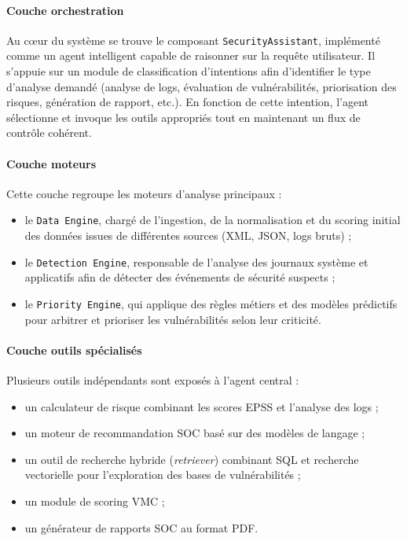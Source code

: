 \documentclass[runningheads]{llncs}
\begin{document}
\paragraph{Couche orchestration}
Au cœur du système se trouve le composant \texttt{SecurityAssistant}, implémenté comme un agent intelligent capable de raisonner sur la requête utilisateur. Il s’appuie sur un module de classification d’intentions afin d’identifier le type d’analyse demandé (analyse de logs, évaluation de vulnérabilités, priorisation des risques, génération de rapport, etc.). En fonction de cette intention, l’agent sélectionne et invoque les outils appropriés tout en maintenant un flux de contrôle cohérent.

\paragraph{Couche moteurs}
Cette couche regroupe les moteurs d’analyse principaux :
\begin{itemize}
    \item le \texttt{Data Engine}, chargé de l’ingestion, de la normalisation et du scoring initial des données issues de différentes sources (XML, JSON, logs bruts) ;
    \item le \texttt{Detection Engine}, responsable de l’analyse des journaux système et applicatifs afin de détecter des événements de sécurité suspects ;
    \item le \texttt{Priority Engine}, qui applique des règles métiers et des modèles prédictifs pour arbitrer et prioriser les vulnérabilités selon leur criticité.
\end{itemize}

\paragraph{Couche outils spécialisés}
Plusieurs outils indépendants sont exposés à l’agent central :
\begin{itemize}
    \item un calculateur de risque combinant les scores EPSS et l’analyse des logs ;
    \item un moteur de recommandation SOC basé sur des modèles de langage ;
    \item un outil de recherche hybride (\textit{retriever}) combinant SQL et recherche vectorielle pour l’exploration des bases de vulnérabilités ;
    \item un module de scoring VMC ;
    \item un générateur de rapports SOC au format PDF.
\end{itemize}
\end{document}
